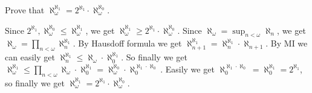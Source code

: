 \documentclass{ctexart}
\begin{document}
\begin{problem}
  Prove that \(\aleph_\omega^{\aleph_1}=2^{\aleph_1}\cdot \aleph_\omega^{\aleph_0}\). 
\end{problem}

\begin{solution}
  Since \(2^{\aleph_1},\aleph_\omega^{\aleph_0} \leq \aleph_\omega^{\aleph_1}\), we get \(\aleph_\omega^{\aleph_1}\geq 2^{\aleph_1}\cdot \aleph_\omega^{\aleph_0}\). 
  Since \(\aleph_\omega=\sup_{n<\omega}\aleph_n\), we get \(\aleph_\omega=\prod_{n<\omega} \aleph_n^{\aleph_1}\). 
  By Hausdoff formula we get \(\aleph_{n+1}^{\aleph_1}=\aleph_n^{\aleph_1} \cdot \aleph_{n+1}\). 
  By MI we can easily get \(\aleph_n^{\aleph_1}\leq \aleph_{\omega}\cdot \aleph_0^{\aleph_1}\). 
  So finally we get \(\aleph_\omega^{\aleph_1}\leq \prod_{n<\omega} \aleph_{\omega}\cdot \aleph_0^{\aleph_1}=\aleph_\omega^{\aleph_0}\cdot \aleph_0^{\aleph_1 \cdot \aleph_0}\). 
  Easily we get \(\aleph_0^{\aleph_1 \cdot \aleph_0}=\aleph_0^{\aleph_1}=2^{\aleph_1}\), 
  so finally we get \(\aleph_\omega^{\aleph_1}=2^{\aleph_1} \cdot \aleph_\omega^{\aleph_0}\). 
\end{solution}
\end{document}
